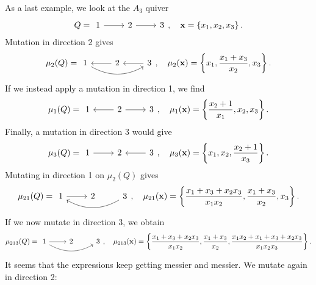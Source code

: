 \documentclass{article}
\newcommand{\bx}{\mathbf{x}}
\begin{document}
\begin{example}
	As a last example, we look at the $A_3$ quiver
	\begin{equation*}
		Q =
		\begin{tikzcd}
			1 \rar[] & 2 \rar[] &3
		\end{tikzcd},
		\quad \bx = \left\{x_1, x_2, x_3\right\}.
	\end{equation*}
	Mutation in direction 2 gives
	\begin{equation*}
		\mu_2(Q) =
		\begin{tikzcd}
			1 \rar[leftarrow] \ar[rr, bend right] & 2 \rar[leftarrow]& 3
		\end{tikzcd},
		\quad \mu_2(\bx) = \left\{x_1, \frac{x_1 + x_3}{x_2}, x_3\right\}.
	\end{equation*}
	If we instead apply a mutation in direction 1, we find
	\begin{equation*}
		\mu_1(Q) =
		\begin{tikzcd}
			1 \rar[leftarrow] & 2 \rar[]& 3
		\end{tikzcd},
		\quad \mu_1(\bx) = \left\{\frac{x_2 + 1}{x_1}, x_2, x_3\right\}.
	\end{equation*}
	Finally, a mutation in direction 3 would give
	\begin{equation*}
		\mu_3(Q) =
		\begin{tikzcd}
			1 \rar[] & 2 \rar[leftarrow]& 3
		\end{tikzcd},
		\quad \mu_3(\bx) = \left\{x_1, x_2, \frac{x_2 + 1}{x_3}\right\}.
	\end{equation*}
	Mutating in direction 1 on $\mu_2(Q)$ gives
	\begin{equation*}
		\mu_{21}(Q) =
		\begin{tikzcd}
			1 \rar[] \ar[rr,leftarrow, bend right] & 2 & 3
		\end{tikzcd},
		\quad \mu_{21}(\bx) = \left\{\frac{x_1 + x_3 + x_2x_3}{x_1x_2}, \frac{x_1 + x_3}{x_2}, x_3\right\}.
	\end{equation*}
	If we now mutate in direction 3, we obtain
	\begin{equation*}
		\mu_{213}(Q) =
		\begin{tikzcd}
			1 \rar[] \ar[rr, bend right] & 2 & 3
		\end{tikzcd},
		\quad \mu_{213}(\bx) = \left\{\frac{x_1 + x_3 + x_2x_3}{x_1x_2}, \frac{x_1 + x_3}{x_2}, \frac{x_1 x_2 + x_1 + x_3 + x_2 x_3}{x_1x_2x_3}\right\}.
	\end{equation*}
	It seems that the expressions keep getting messier and messier. We mutate again in direction 2:

\end{example}
\end{document}
